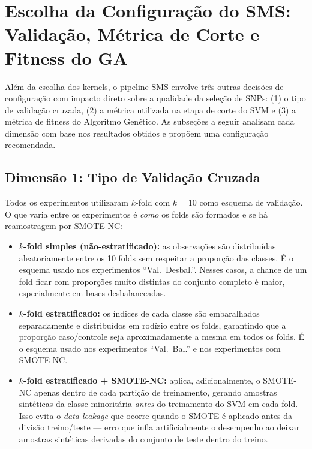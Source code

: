 \documentclass[
    12pt,
    a4paper,
    oneside,
    english,
    french,
    spanish,
    brazil
    ]{abntex2}
\newcommand{\novo}[1]{\textcolor{corNova}{#1}}
\begin{document}
\chapter*{Escolha da Configuração do SMS: Validação, Métrica de Corte e Fitness do GA}

\novo{Além da escolha dos kernels, o pipeline SMS envolve três outras decisões de configuração com impacto direto sobre a qualidade da seleção de SNPs: (1) o tipo de validação cruzada, (2) a métrica utilizada na etapa de corte do SVM e (3) a métrica de fitness do Algoritmo Genético. As subseções a seguir analisam cada dimensão com base nos resultados obtidos e propõem uma configuração recomendada.}

\section*{Dimensão 1: Tipo de Validação Cruzada}

\novo{Todos os experimentos utilizaram $k$-fold com $k = 10$ como esquema de validação. O que varia entre os experimentos é \emph{como} os folds são formados e se há reamostragem por SMOTE-NC:}
\begin{itemize}
  \item \novo{\textbf{$k$-fold simples (não-estratificado):} as observações são distribuídas aleatoriamente entre os 10 folds sem respeitar a proporção das classes. É o esquema usado nos experimentos ``Val.\ Desbal.''. Nesses casos, a chance de um fold ficar com proporções muito distintas do conjunto completo é maior, especialmente em bases desbalanceadas.}
  \item \novo{\textbf{$k$-fold estratificado:} os índices de cada classe são embaralhados separadamente e distribuídos em rodízio entre os folds, garantindo que a proporção caso/controle seja aproximadamente a mesma em todos os folds. É o esquema usado nos experimentos ``Val.\ Bal.'' e nos experimentos com SMOTE-NC.}
  \item \novo{\textbf{$k$-fold estratificado + SMOTE-NC:} aplica, adicionalmente, o SMOTE-NC apenas dentro de cada partição de treinamento, gerando amostras sintéticas da classe minoritária \emph{antes} do treinamento do SVM em cada fold. Isso evita o \textit{data leakage} que ocorre quando o SMOTE é aplicado antes da divisão treino/teste --- erro que infla artificialmente o desempenho ao deixar amostras sintéticas derivadas do conjunto de teste dentro do treino.}
\end{itemize}
\end{document}

